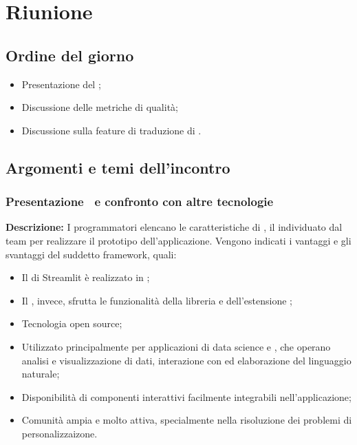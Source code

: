 \section{Riunione}
\subsection{Ordine del giorno}
\begin{itemize}
	\item Presentazione del  ;
	\item Discussione delle metriche di qualità;
	\item Discussione sulla feature di traduzione di .
\end{itemize}

\subsection{Argomenti e temi dell'incontro}

\subsubsection{Presentazione \ e confronto con altre tecnologie}

\par \textbf{Descrizione:} I programmatori elencano le caratteristiche di , il  individuato dal team per realizzare il prototipo dell’applicazione. Vengono indicati i vantaggi e gli svantaggi del suddetto framework, quali:
\begin{itemize}
	\item Il  di Streamlit è realizzato in ;
	\item Il , invece, sfrutta le funzionalità della libreria  e dell'estensione ;
	\item Tecnologia open source;
	\item Utilizzato principalmente per applicazioni di data science e , che operano analisi e visualizzazione di dati, interazione con  ed elaborazione del linguaggio naturale;
	\item Disponibilità di componenti interattivi facilmente integrabili nell'applicazione;
	\item Comunità ampia e molto attiva, specialmente nella risoluzione dei problemi di personalizzaizone.
\end{itemize}

